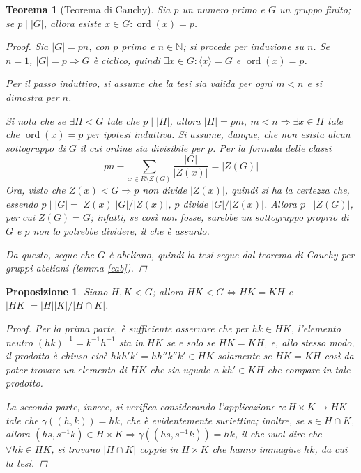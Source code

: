 \documentclass[12pt]{scrartcl}
\theoremstyle{style}
\newtheorem{prop}{Proposizione}[section]
\newtheorem{teorema}{Teorema}[section]
\numberwithin{equation}{subsection}
\begin{document}
\begin{teorema}
	[Teorema di Cauchy]
	Sia $p$ un numero primo e $G$ un gruppo finito; se $p  \mid |G|$, allora esiste $x \in G : \operatorname{ord}(x) = p $.
	\begin{proof}
		Sia $|G| = pn$, con $p$ primo e $n \in \mathbb{N}$; si procede per induzione su $n$.
		Se $n=1$, $|G| = p \Rightarrow G$ \`e ciclico, quindi $\exists x \in G : \langle x \rangle=G$ e $\operatorname{ord}(x) = p$.

		Per il passo induttivo, si assume che la tesi sia valida per ogni $ m < n$ e si dimostra per $n$.

Si nota che se $\exists  H < G$ tale che $p  \mid  \lvert H \rvert $, allora $|H|=pm , \ m < n \Rightarrow \exists x \in H$ tale che $\operatorname{ord}(x) =p$ per ipotesi induttiva.
Si assume, dunque, che non esista alcun sottogruppo di $G$ il cui ordine sia divisibile per $p$.
Per la formula delle classi
\[
pn - \sum_{x \in R\setminus Z(G)}^{} \frac{\lvert G \rvert }{|Z(x)|} = \lvert Z(G) \rvert 
\] 
Ora, visto che $Z(x) < G \Rightarrow p$ non divide $|Z(x)|$, quindi si ha la certezza che, essendo $p  \mid |G| = |Z(x)| |G|/|Z(x)|$, $p$ divide $|G|/|Z(x)|$. 
Allora $p  \mid  |Z(G)|$, per cui $Z(G) =G$; infatti, se cos\`i non fosse, sarebbe un sottogruppo proprio di $G$ e $p$ non lo potrebbe dividere, il che \`e assurdo.

Da questo, segue che $G$ \`e abeliano, quindi la tesi segue dal teorema di Cauchy per gruppi abeliani (lemma \ref{cab}).
	\end{proof}
\end{teorema}
\begin{prop}\label{tgen}
Siano $H,K < G$; allora $HK < G \iff HK = KH$ e $\lvert HK \rvert = \lvert H \rvert \lvert K \rvert / \lvert H \cap K \rvert $.
\begin{proof}
Per la prima parte, \`e sufficiente osservare che per $hk \in HK$, l'elemento neutro $(hk)^{-1} = k^{-1} h^{-1} $ sta in $HK$ se e solo se $HK = KH$, e, allo stesso modo, il prodotto \`e chiuso cio\`e $hkh'k' = hh''k''k' \in HK$ solamente se $HK = KH$ cos\`i da poter trovare un elemento di $HK$ che sia uguale a $kh'\in KH$ che compare in tale prodotto.

La seconda parte, invece, si verifica considerando l'applicazione $\gamma: H \times K\to HK$ tale che $\gamma((h,k)) = hk$, che \`e evidentemente suriettiva; inoltre, se $s \in H \cap K$, allora $(hs,s^{-1}k) \in H \times K\Rightarrow \gamma ((hs,s^{-1}k)) = hk$, il che vuol dire che $\forall hk \in HK$, si trovano $|H\cap K|$ coppie in $H \times K$ che hanno immagine $hk$, da cui la tesi.
\end{proof}
\end{prop}
\end{document}
